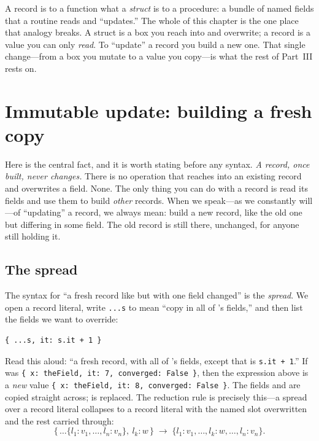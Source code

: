 \begin{keyidea}
A record is to a function what a \emph{struct} is to a procedure: a bundle of
named fields that a routine reads and ``updates.'' The whole of this chapter is
the one place that analogy breaks. A struct is a box you reach into and
overwrite; a record is a value you can only \emph{read}. To ``update'' a record
you build a new one. That single change---from a box you mutate to a value you
copy---is what the rest of Part~III rests on.
\end{keyidea}

\section{Immutable update: building a fresh copy}

Here is the central fact, and it is worth stating before any syntax. \emph{A
record, once built, never changes.} There is no operation that reaches into an
existing record and overwrites a field. None. The only thing you can do with a
record is read its fields and use them to build \emph{other} records. When we
speak---as we constantly will---of ``updating'' a record, we always mean: build
a new record, like the old one but differing in some field. The old record is
still there, unchanged, for anyone still holding it.

\subsection{The spread}

The syntax for ``a fresh record like  but with one field changed'' is the
\emph{spread}. We open a record literal, write \lstinline[style=l4style]|...s| to
mean ``copy in all of 's fields,'' and then list the fields we want to
override:

\begin{lstlisting}[style=l4style]
{ ...s, it: s.it + 1 }
\end{lstlisting}

Read this aloud: ``a fresh record, with all of 's fields, except that
 is \lstinline[style=l4style]|s.it + 1|.'' If  was
\lstinline[style=l4style]|{ x: theField, it: 7, converged: False }|, then the
expression above is a \emph{new} value
\lstinline[style=l4style]|{ x: theField, it: 8, converged: False }|. The fields
 and  are copied straight across;  is replaced.
The reduction rule is precisely this---a spread over a record literal collapses
to a record literal with the named slot overwritten and the rest carried through:
\[
  \{\,\dots\{l_1\!:\!v_1,\dots,l_n\!:\!v_n\},\ l_k\!:\!w\,\}
  \;\to\;
  \{l_1\!:\!v_1,\dots,l_k\!:\!w,\dots,l_n\!:\!v_n\}.
\]

